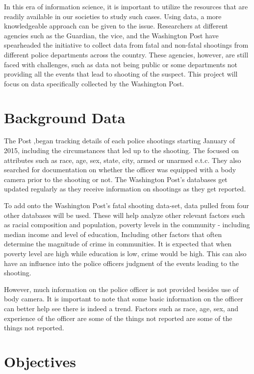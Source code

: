 \documentclass[a4paper,12pt]{article}
\begin{document}
In this era of information science, it is important to utilize the resources that are readily available in our societies to study such cases. Using data, a more knowledgeable approach can be given to the issue. Researchers at different agencies such as the Guardian, the vice, and the Washington Post have spearheaded the initiative to collect data from fatal and non-fatal shootings from different police departments across the country. These agencies, however, are still faced with challenges, such as data not being public or some departments not providing all the events that lead to shooting of the suspect. This project will focus on data specifically collected by the Washington Post\cite{fatal_force}. 

\section*{Background Data}

The Post \cite{washington_post},began tracking details of each police shootings starting January of 2015, including the circumstances that led up to the shooting. The focused on attributes such as race, age, sex, state, city, armed or unarmed e.t.c. They also searched for documentation on whether the officer was equipped with a body camera prior to the shooting or not. The Washington Post's databases get updated regularly as they receive information on shootings as they get reported.

To add onto the Washington Post's fatal shooting data-set, data pulled from four other databases will be used. These will help analyze other relevant factors such as racial composition and population, poverty levels in the community - including median income and level of education, Including other factors that often determine the magnitude of crime in communities. It is expected that when poverty level are high while education is low, crime would be high. This can also have an influence into the police officers judgment of the events leading to the shooting\cite{deadly_force}. 

However, much information on the police officer is not provided besides use of body camera. It is important to note that some basic information on the officer can better help see there is indeed a trend. Factors such as race, age, sex, and experience of the officer are some of the things not reported are some of the things not reported.

\section*{Objectives}
\end{document}
